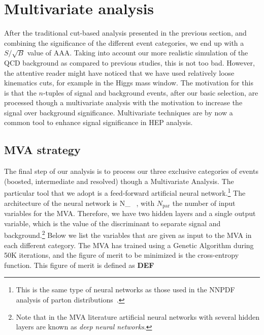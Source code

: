 
\section{Multivariate analysis}
\label{sec:mva}

After the traditional cut-based analysis presented in the previous section,
and combining the significance of the different event categories,
we end up with a $S/\sqrt{B}$ value of AAA.
%
Taking into account our more realistic simulation of the QCD background as
compared to previous studies, this is not too bad.
%
However, the attentive reader might have noticed that we have used
relatively 
loose kinematics cuts, for example in the Higgs mass window.
%
The motivation for this is that the $n$-tuples of signal and background
events, after our basic selection, are processed though a multivariate
analysis with the motivation to increase the signal over background
significance.
%
Multivariate techniques are by now a common tool to enhance signal
significance in HEP analysis.

\subsection{MVA strategy}

The final step of our analysis is to process our three exclusive
categories of events (boosted, intermediate and resolved) though
a Multivariate Analysis.
%
The particular tool that we adopt is
a feed-forward artificial neural network.\footnote{This is the
  same type of neural networks as those used in the
  NNPDF analysis of parton distributions~\cite{Ball:2010de}.}
%
The architecture of the neural network is
\be
N_{} \, ,
\ee
with $N_{\mathrm{par}}$ the number of input variables for the MVA.
%
Therefore, we have two hidden layers and a single output variable, which
is the value of the discriminant to separate signal and background.\footnote{Note that in the MVA literature artificial neural networks with several hidden
  layers are known as {\it deep neural networks}.}
%
Below we list the variables that are given as input to the MVA in each
different category.
%
The MVA has trained using a Genetic Algorithm during 50K iterations,
and the figure of merit to be minimized is the cross-entropy function.
%
This figure of merit is defined as
\be
\bf DEF
\ee

